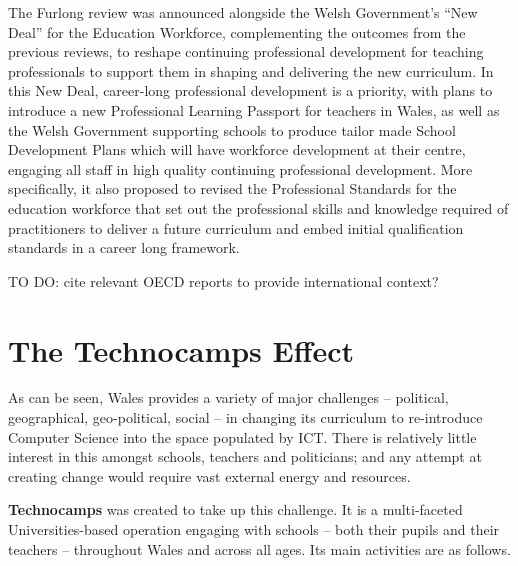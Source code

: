 \documentclass{sig-alternate}
\begin{document}

The Furlong review was announced alongside the Welsh Government's ``New
Deal'' for the Education Workforce, complementing the outcomes from the
previous reviews, to reshape continuing professional development for
teaching professionals to support them in shaping and delivering the
new curriculum. In this New Deal, career-long professional development
is a priority, with plans to introduce a new Professional Learning
Passport for teachers in Wales, as well as the Welsh Government
supporting schools to produce tailor made School Development Plans
which will have workforce development at their centre, engaging all
staff in high quality continuing professional development. More
specifically, it also proposed to revised the Professional Standards
for the education workforce that set out the professional skills and
knowledge required of practitioners to deliver a future curriculum and
embed initial qualification standards in a career long framework.


TO DO: cite relevant OECD reports to provide international context?


\section{The Technocamps Effect}

As can be seen, Wales provides a variety of major challenges
-- political, geographical, geo-political, social --
in changing its curriculum to re-introduce Computer Science
into the space populated by ICT.
There is relatively little interest in this
amongst schools, teachers and politicians;
and any attempt at creating change would require
vast external energy and resources.

\textbf{Technocamps} was created to take up this challenge.
It is a multi-faceted Universities-based
operation engaging with schools -- both their pupils and their teachers --
throughout Wales and across all ages. Its main activities are as follows.
\end{document}
